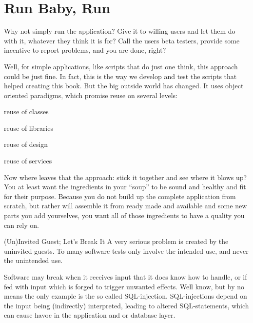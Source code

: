 \documentclass[\docroot/main]{subfiles}
\begin{document}
\chapter{Run Baby, Run}
\begin{wrapfigure}{R}{.4\textwidth}
\end{wrapfigure}
Why not simply run the application?
Give it to willing users and let them do with it, whatever they think it is for?
Call the users beta testers, provide some incentive to report problems, and you are done, right?

Well, for simple applications, like scripts that do just one think,
this approach could be just fine. In fact, this is the way we develop
and test the scripts that helped creating this book. But the big
outside world has changed. It uses object oriented paradigms, which
promise  reuse on several levels:
\begin{multicols}{2}
\begin{itemize*}
\item reuse of classes
\item reuse of libraries
\item reuse of design
\item reuse of services
\end{itemize*}
\end{multicols}
Now where leaves that the approach: stick it together and see where it blows
up? You at least want the ingredients in your ``soup'' to be sound and
healthy and fit for their purpose. Because you do not build up the
complete application from scratch, but rather will assemble it from
ready made and available and some new parts you add yourselves, you
want all of those ingredients to have a quality you can rely on.

\begin{textbox}{(Un)Invited Guest; Let's Break It}%
  A very serious problem is created by the uninvited guests. To many
  software tests only involve the intended use, and never the
  unintended use. 

  Software may break when it receives input that it does know
  how to handle, or if fed with input which is forged to trigger
  unwanted effects. Well know, but by no means the only example is the so called
  SQL-injection. SQL-injections depend
  on the input being (indirectly) interpreted, leading to altered SQL-statements, 
  which can cause havoc in the application and or database layer.
\end{textbox}
\end{document}
